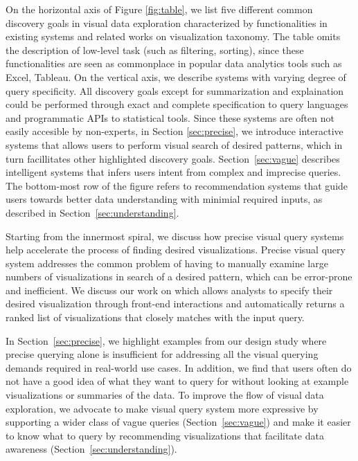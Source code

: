 \par On the horizontal axis of Figure \ref{fig:table}, we list five different common discovery goals in visual data exploration characterized by functionalities in existing systems and related works on visualization taxonomy\cite{Heer2012,Amar2005}. The table omits the description of low-level task (such as filtering, sorting), since these functionalities are seen as commonplace in popular data analytics tools such as Excel, Tableau. On the vertical axis, we describe systems with varying degree of query specificity. All discovery goals except for summarization and explaination could be performed through exact and complete specification to query languages and programmatic APIs to statistical tools. Since these systems are often not easily accesible by non-experts, in Section \ref{sec:precise}, we introduce interactive systems that allows users to perform visual search of desired patterns, which in turn facillitates other highlighted discovery goals. Section~\ref{sec:vague} describes intelligent systems that infers users intent from complex and imprecise queries. The bottom-most row of the figure refers to recommendation systems that guide users towards better data understanding with minimial required inputs, as described in Section~\ref{sec:understanding}.
\par Starting from the innermost spiral, we discuss how precise visual query systems help accelerate the process of finding desired visualizations. Precise visual query system addresses the common problem of having to manually examine large numbers of visualizations in search of a desired pattern, which can be error-prone and inefficient. We discuss our work on \zv which allows analysts to specify their desired visualization through front-end interactions and automatically returns a ranked list of visualizations that closely matches with the input query.
\par In Section~\ref{sec:precise}, we highlight examples from our \zv design study where precise querying alone is insufficient for addressing all the visual querying demands required in real-world use cases. In addition, we find that users often do not have a good idea of what they want to query for without looking at example visualizations or summaries of the data. To improve the flow of visual data exploration, we advocate to make visual query system more expressive by supporting a wider class of vague queries (Section~\ref{sec:vague}) and make it easier to know what to query by recommending visualizations that facilitate data awareness (Section~\ref{sec:understanding}).

